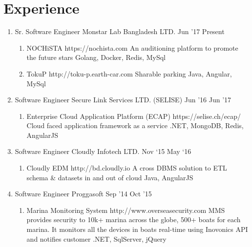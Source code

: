 \section{Experience}

\begin{enumerate}
  \item
    \xp
    {Sr. Software Engineer}
    {Monstar Lab Bangladesh LTD.}
    {Jun '17}
    {Present}

  \begin{enumerate}
    \item\p
      {NOCHiSTA}
      {https://nochista.com}
      {An auditioning platform to promote the future stars}
      {Golang, Docker, Redis, MySql}

    \item\p
      {TokuP}
      {http://toku-p.earth-car.com}
      {Sharable parking}
      {Java, Angular, MySql}
  \end{enumerate}

  \item
    \xp
    {Software Engineer}
    {Secure Link Services LTD. (SELISE)}
    {Jun '16}
    {Jun '17}

  \begin{enumerate}
    \item\p
      {Enterprise Cloud Application Platform (ECAP)}
      {https://selise.ch/ecap/}
      {Cloud faced application framework as a service}
      {.NET, MongoDB, Redis, AngularJS}
  \end{enumerate}

  \item
    \xp
    {Software Engineer}
    {Cloudly Infotech LTD.}
    {Nov ‘15}
    {May ‘16}

  \begin{enumerate}
    \item\p
      {Cloudly EDM}
      {http://bd.cloudly.io}
      {A cross DBMS solution to ETL schema \& datasets in and out of cloud}
      {Java, AngularJS}
  \end{enumerate}

  \item
    \xp
    {Software Engineer}
    {Proggasoft}
    {Sep '14}
    {Oct '15}

  \begin{enumerate}
    \item\p
      {Marina Monitoring System}
      {http://www.overseasecurity.com}
      {MMS provides security to 10k+ marina across the globe, 500+ boats for each marina. It monitors all the devices in boats real-time using Inovonics API and notifies customer}
      {.NET, SqlServer, jQuery}
  \end{enumerate}
\end{enumerate}
